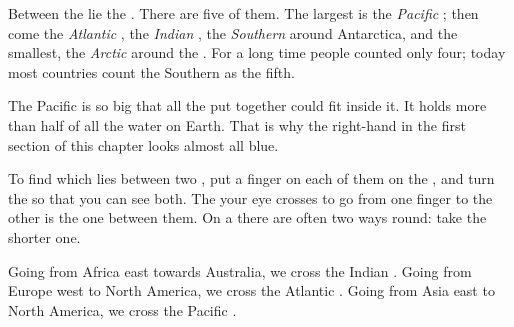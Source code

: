 Between the  lie the . There are five of them. The largest
is the \emph{Pacific }; then come the \emph{Atlantic }, the
\emph{Indian }, the \emph{Southern } around Antarctica, and the
smallest, the \emph{Arctic } around the . For a long time
people counted only four; today most countries count the Southern  as
the fifth.

\begin{example}\label{ex:g3:continents-and-oceans:pacific}
The Pacific  is so big that all the  put together could fit
inside it. It holds more than half of all the  water on Earth. That is
why the right-hand  in the first section of this chapter looks almost
all blue.
\end{example}

\begin{method}\label{met:g3:continents-and-oceans:between}
To find which  lies between two , put a finger on each of
them on the , and turn the  so that you can see both. The 
your eye crosses to go from one finger to the other is the one between them.
On a  there are often two ways round: take the shorter one.
\end{method}

\begin{example}\label{ex:g3:continents-and-oceans:africa-australia}
Going from Africa east towards Australia, we cross the Indian . Going
from Europe west to North America, we cross the Atlantic . Going from
Asia east to North America, we cross the Pacific .
\end{example}

